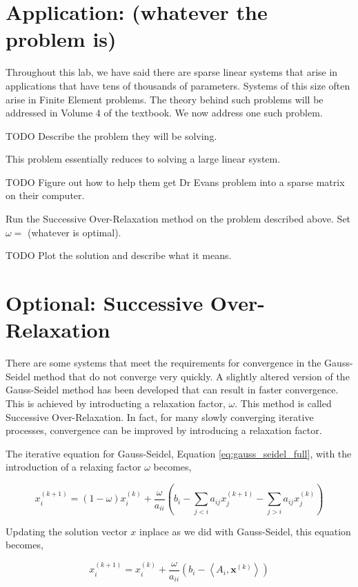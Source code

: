\section*{Application: (whatever the problem is)}
Throughout this lab, we have said there are sparse linear systems that arise in applications that have tens of thousands of parameters. Systems of this size
often arise in Finite Element problems. The theory behind such problems will be
addressed in Volume 4 of the textbook. We now address one such problem.

\begin{problem} \label{prob:application}
TODO Describe the problem they will be solving.

This problem essentially reduces to solving a large linear system.

TODO Figure out how to help them get Dr Evans problem into a sparse matrix on
their computer.

Run the Successive Over-Relaxation method on the problem described above. Set
$\omega = $ (whatever is optimal).

TODO Plot the solution and describe what it means.
\end{problem}

\section*{Optional: Successive Over-Relaxation}
There are some systems that meet the requirements for convergence in the
Gauss-Seidel method that do not converge very quickly. A slightly altered version
of the Gauss-Seidel method has been developed that can result in faster convergence.
This is achieved by introducting a relaxation factor, $\omega$. This method is
called Successive Over-Relaxation. In fact, for many slowly converging iterative processes, convergence can be improved by introducing a relaxation factor.

The iterative equation for Gauss-Seidel, Equation \ref{eq:gauss_seidel_full},
with the introduction of a relaxing factor $\omega$ becomes,

$$
x_i^{(k+1)} = (1 - \omega)x_i^{(k)} + \frac{\omega}{a_{ii}} \left (b_i - \sum_{j < i}a_{ij}x^{(k+1)}_j - \sum_{j > i}a_{ij}x^{(k)}_j \right )
$$

Updating the solution vector $x$ inplace as we did with Gauss-Seidel, this
equation becomes,

\begin{equation} \label{eq:sor}
x^{(k+1)}_i = x^{(k)}_i + \frac{\omega}{a_{ii}} \left ( b_i - \left < A_i, \mathbf{x}^{(k)} \right > \right )
\end{equation}

